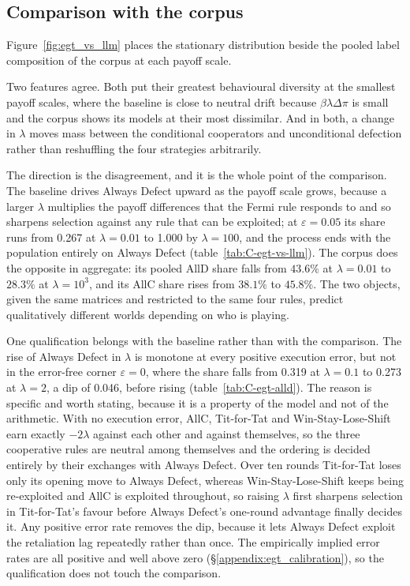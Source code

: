 \documentclass[11pt,a4paper]{article}
\newcommand{\lam}{\lambda}
\begin{document}


\subsection{Comparison with the corpus}\label{appendix:egt_vs_llm}

Figure~\ref{fig:egt_vs_llm} places the stationary distribution beside the
pooled label composition of the corpus at each payoff scale.

Two features agree. Both put their greatest behavioural diversity at the
smallest payoff scales, where the baseline is close to neutral drift because
$\beta \lam \Delta\pi$ is small and the corpus shows its models at their most
dissimilar. And in both, a change in $\lam$ moves mass between the conditional
cooperators and unconditional defection rather than reshuffling the four
strategies arbitrarily.

The direction is the disagreement, and it is the whole point of the comparison.
The baseline drives Always Defect upward as the payoff scale grows, because a
larger $\lam$ multiplies the payoff differences that the Fermi rule responds to
and so sharpens selection against any rule that can be exploited; at
$\varepsilon = 0.05$ its share runs from 0.267 at $\lam = 0.01$ to 1.000 by
$\lam = 100$, and the process ends with the population entirely on Always
Defect (table~\ref{tab:C-egt-vs-llm}). The corpus does the opposite in
aggregate: its pooled AllD share falls from $43.6\%$ at $\lam = 0.01$ to
$28.3\%$ at $\lam = 10^{3}$, and its AllC share rises from $38.1\%$ to
$45.8\%$. The two objects, given the same matrices and restricted to the same
four rules, predict qualitatively different worlds depending on who is playing.

One qualification belongs with the baseline rather than with the comparison.
The rise of Always Defect in $\lam$ is monotone at every positive execution
error, but not in the error-free corner $\varepsilon = 0$, where the share falls
from 0.319 at $\lam = 0.1$ to 0.273 at $\lam = 2$, a dip of 0.046, before rising
(table~\ref{tab:C-egt-alld}). The reason is
specific and worth stating, because it is a property of the model and not of
the arithmetic. With no execution error, AllC, Tit-for-Tat and
Win-Stay-Lose-Shift earn exactly $-2\lam$ against each other and against
themselves, so the three cooperative rules are neutral among themselves and the
ordering is decided entirely by their exchanges with Always Defect. Over ten
rounds Tit-for-Tat loses only its opening move to Always Defect, whereas
Win-Stay-Lose-Shift keeps being re-exploited and AllC is exploited throughout,
so raising $\lam$ first sharpens selection in Tit-for-Tat's favour before
Always Defect's one-round advantage finally decides it. Any positive error rate
removes the dip, because it lets Always Defect exploit the retaliation lag
repeatedly rather than once. The empirically implied error rates are all
positive and well above zero (\S\ref{appendix:egt_calibration}), so the
qualification does not touch the comparison.
\end{document}
